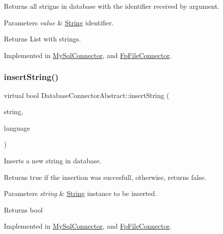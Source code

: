 Returns all strigns in database with the identifier received by argument. 


\begin{DoxyParams}{Parameters}
{\em value} & \mbox{\hyperlink{classString}{String}} identifier. \\
\hline
\end{DoxyParams}
\begin{DoxyReturn}{Returns}
List with strings. 
\end{DoxyReturn}


Implemented in \mbox{\hyperlink{classMySqlConnector_a269bbced50451ff0ce48cfc4f2bb6a3b}{My\+Sql\+Connector}}, and \mbox{\hyperlink{classFpFileConnector_a29a6df6ea88a1e44f6b04c600b45925c}{Fp\+File\+Connector}}.

\mbox{\label{classDatabaseConnectorAbstract_ac7cc5cf2deace9652810001722758206}} 
\subsubsection{\texorpdfstring{insert\+String()}{insertString()}}
{\footnotesize\ttfamily virtual bool Database\+Connector\+Abstract\+::insert\+String (\begin{DoxyParamCaption}\item[{const \mbox{\hyperlink{classString}{String}} \&}]{string,  }\item[{const Q\+String}]{language }\end{DoxyParamCaption})\hspace{0.3cm}{\ttfamily [pure virtual]}}



Inserts a new string in database. 

Returns true if the insertion was succesfull, otherwise, returns false. 
\begin{DoxyParams}{Parameters}
{\em string} & \mbox{\hyperlink{classString}{String}} instance to be inserted. \\
\hline
\end{DoxyParams}
\begin{DoxyReturn}{Returns}
bool 
\end{DoxyReturn}


Implemented in \mbox{\hyperlink{classMySqlConnector_a4608c0764241969454a55b42873cb86b}{My\+Sql\+Connector}}, and \mbox{\hyperlink{classFpFileConnector_ae4f79d6a1281a20702b0257de56822b2}{Fp\+File\+Connector}}.

